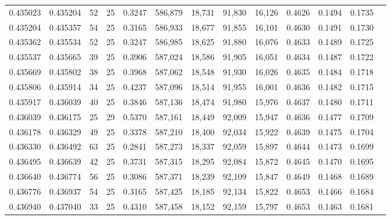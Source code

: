 \begin{tabular}{rrrrrrrrrrrrr}
0.435023 & 0.435204 &    52 &  25 &                                     0.3247 & 586,879 &  18,731 &  91,830 &  16,126 & 0.4626 & 0.1494 & 0.1735 \\
0.435204 & 0.435357 &    54 &  25 &                                     0.3165 & 586,933 &  18,677 &  91,855 &  16,101 & 0.4630 & 0.1491 & 0.1730 \\
0.435362 & 0.435534 &    52 &  25 &                                     0.3247 & 586,985 &  18,625 &  91,880 &  16,076 & 0.4633 & 0.1489 & 0.1725 \\
0.435537 & 0.435665 &    39 &  25 &                                     0.3906 & 587,024 &  18,586 &  91,905 &  16,051 & 0.4634 & 0.1487 & 0.1722 \\
0.435669 & 0.435802 &    38 &  25 &                                     0.3968 & 587,062 &  18,548 &  91,930 &  16,026 & 0.4635 & 0.1484 & 0.1718 \\
0.435806 & 0.435914 &    34 &  25 &                                     0.4237 & 587,096 &  18,514 &  91,955 &  16,001 & 0.4636 & 0.1482 & 0.1715 \\
0.435917 & 0.436039 &    40 &  25 &                                     0.3846 & 587,136 &  18,474 &  91,980 &  15,976 & 0.4637 & 0.1480 & 0.1711 \\
0.436039 & 0.436175 &    25 &  29 &                                     0.5370 & 587,161 &  18,449 &  92,009 &  15,947 & 0.4636 & 0.1477 & 0.1709 \\
0.436178 & 0.436329 &    49 &  25 &                                     0.3378 & 587,210 &  18,400 &  92,034 &  15,922 & 0.4639 & 0.1475 & 0.1704 \\
0.436330 & 0.436492 &    63 &  25 &                                     0.2841 & 587,273 &  18,337 &  92,059 &  15,897 & 0.4644 & 0.1473 & 0.1699 \\
0.436495 & 0.436639 &    42 &  25 &                                     0.3731 & 587,315 &  18,295 &  92,084 &  15,872 & 0.4645 & 0.1470 & 0.1695 \\
0.436640 & 0.436774 &    56 &  25 &                                     0.3086 & 587,371 &  18,239 &  92,109 &  15,847 & 0.4649 & 0.1468 & 0.1689 \\
0.436776 & 0.436937 &    54 &  25 &                                     0.3165 & 587,425 &  18,185 &  92,134 &  15,822 & 0.4653 & 0.1466 & 0.1684 \\
0.436940 & 0.437040 &    33 &  25 &                                     0.4310 & 587,458 &  18,152 &  92,159 &  15,797 & 0.4653 & 0.1463 & 0.1681 \\

\end{tabular}
